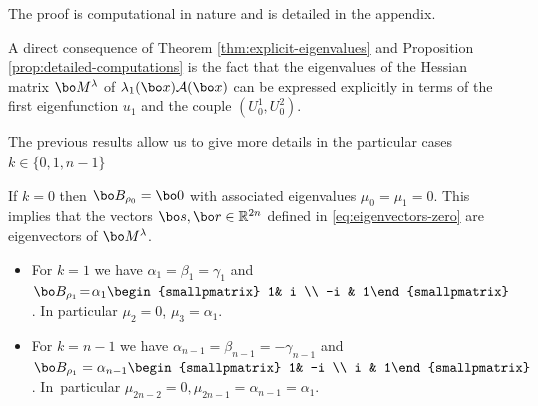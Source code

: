 The proof is computational in nature and is detailed in the appendix.

\begin{rem}
A direct consequence of Theorem \ref{thm:explicit-eigenvalues} and Proposition \ref{prop:detailed-computations} is the fact that the eigenvalues of the Hessian matrix $\bo M^\lambda$ of $\lambda_1(\bo x)\mathcal A(\bo x)$ can be expressed explicitly in terms of the first eigenfunction $u_1$ and the couple $(U_0^1,U_0^2)$.
\end{rem}

The previous results allow us to give more details in the particular cases $k\in \{0,1,n-1\}$
\begin{propo}
If $k=0$ then $\bo B_{\rho_0}= \bo 0$ with associated eigenvalues $\mu_0=\mu_1=0$. This implies that the vectors $\bo s, \bo r \in \Bbb{R}^{2n}$ defined in \eqref{eq:eigenvectors-zero} are eigenvectors of $\bo M^\lambda$.
\begin{itemize}
\item
For $k\!=\!1$ we have $\alpha_1\!=\!\beta_1\!=\!\gamma_1$ and $\bo B_{\rho_1} \!=\! \alpha_1 \begin{smallpmatrix} 1& i \\ -i & 1\end{smallpmatrix}$. In particular $\mu_{2} \!=\! 0$, $\mu_{3} \!=\! \alpha_1$.

\item
For $k=n-1$ we have $\alpha_{n-1}=\beta_{n-1}=-\gamma_{n-1}$ and $\bo B_{\rho_1} = \alpha_{n-1} \begin{smallpmatrix} 1& -i \\ i & 1\end{smallpmatrix}$. In~particular $\mu_{2n-2} = 0, \mu_{2n-1} = \alpha_{n-1}=\alpha_1$.
\end{itemize}
\label{prop:k=0,1}
\end{propo}

